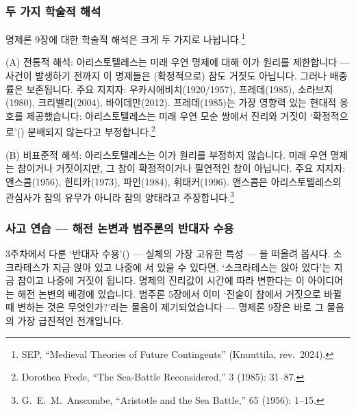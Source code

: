 \documentclass[12pt, a4paper]{article}
\begin{document}
\subsubsection{두 가지 학술적 해석}

명제론 9장에 대한 학술적 해석은 크게 두 가지로 나뉩니다.\footnote{SEP, ``Medieval Theories of Future Contingents'' (Knuuttila, rev.\ 2024).}

(A) 전통적 해석: 아리스토텔레스는 미래 우연 명제에 대해 이가 원리를 제한합니다 --- 사건이 발생하기 전까지 이 명제들은 (확정적으로) 참도 거짓도 아닙니다. 그러나 배중률은 보존됩니다. 주요 지지자: 우카시에비치(1920/1957), 프레데(1985), 소라브지(1980), 크리벨리(2004), 바이데만(2012). 프레데(1985)는 가장 영향력 있는 현대적 옹호를 제공했습니다: 아리스토텔레스는 미래 우연 모순 쌍에서 진리와 거짓이 `확정적으로'() 분배되지 않는다고 부정합니다.\footnote{Dorothea Frede, ``The Sea-Battle Reconsidered,''  3 (1985): 31--87.}

(B) 비표준적 해석: 아리스토텔레스는 이가 원리를 부정하지 않습니다. 미래 우연 명제는 참이거나 거짓이지만, 그 참이 확정적이거나 필연적인 참이 아닙니다. 주요 지지자: 앤스콤(1956), 힌티카(1973), 파인(1984), 휘태커(1996). 앤스콤은 아리스토텔레스의 관심사가 참의 유무가 아니라 참의 양태라고 주장합니다.\footnote{G.\ E.\ M.\ Anscombe, ``Aristotle and the Sea Battle,''  65 (1956): 1--15.}

\subsubsection{사고 연습 --- 해전 논변과 범주론의 반대자 수용}

3주차에서 다룬 `반대자 수용'() --- 실체의 가장 고유한 특성 --- 을 떠올려 봅시다. 소크라테스가 지금 앉아 있고 나중에 서 있을 수 있다면, `소크라테스는 앉아 있다'는 지금 참이고 나중에 거짓이 됩니다. 명제의 진리값이 시간에 따라 변한다는 이 아이디어는 해전 논변의 배경에 있습니다. 범주론 5장에서 이미 `진술이 참에서 거짓으로 바뀔 때 변하는 것은 무엇인가?'라는 물음이 제기되었습니다 --- 명제론 9장은 바로 그 물음의 가장 급진적인 전개입니다.
\end{document}

